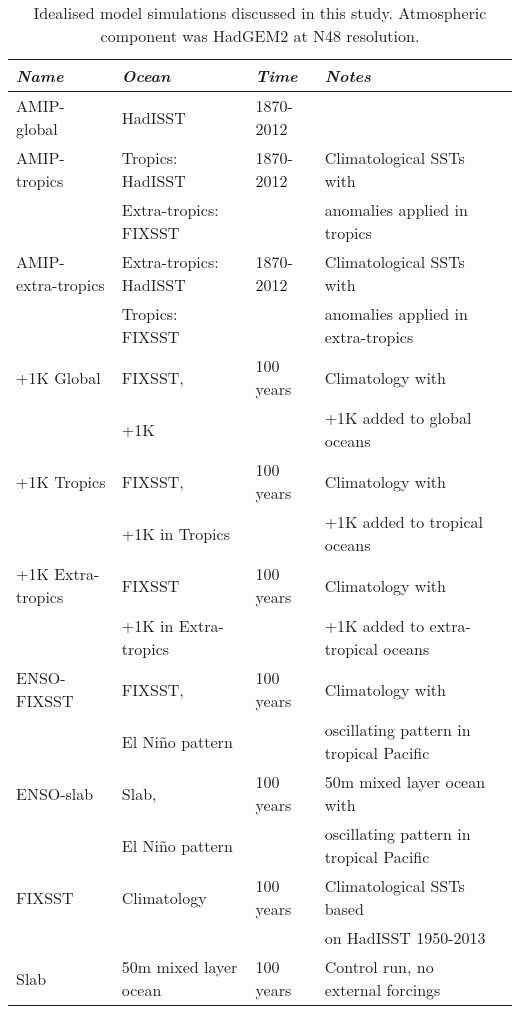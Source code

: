 \begin{center}
	\begin{table}[ht]
		\caption{Idealised model simulations discussed in this study. Atmospheric 
		component was HadGEM2 at N48 resolution.}
		\label{tab:senseexp}
		\scriptsize
	\begin{tabular}{ l  l  l  l l}
		\textit{Name}		&  \textit{Ocean} & \textit{Time} &\textit{ Notes 
	}\\ 
	\hline \hline

	AMIP-global &    HadISST & 1870-2012 &  \\
	AMIP-tropics	   & Tropics: HadISST & 1870-2012 & Climatological SSTs with \\
		&Extra-tropics: FIXSST&& anomalies applied in tropics \\
	AMIP-extra-tropics     & Extra-tropics: HadISST & 1870-2012 & 
		Climatological SSTs with \\
		& Tropics: FIXSST && anomalies applied in extra-tropics  \\
\hline
	+1K Global    & FIXSST,  & 100 years & Climatology with \\
												 & +1K && +1K added to global oceans \\
	+1K Tropics     & FIXSST, & 100 years & Climatology with \\
												 & +1K in Tropics && +1K added to 
		tropical oceans \\
	+1K Extra-tropics	   & FIXSST & 100 years &Climatology with \\
											& +1K in Extra-tropics && +1K added to 
		extra-tropical oceans \\
\hline
	ENSO-FIXSST    &  FIXSST, & 100 years & Climatology with \\
											& El Ni{\~n}o pattern && oscillating 
		pattern in tropical Pacific\\
	ENSO-slab    & Slab,  & 100 years & 50m mixed layer ocean with \\
											& El Ni{\~n}o pattern && oscillating 
		pattern in tropical Pacific\\
\hline
	FIXSST    & Climatology & 100 years & Climatological SSTs based  \\
								  &&& on HadISST 1950-2013 \\
	Slab 	   & 50m mixed layer ocean & 100 years & Control run, no external 
		forcings \\
	\hline
	\end{tabular}
	\end{table}
\end{center}



